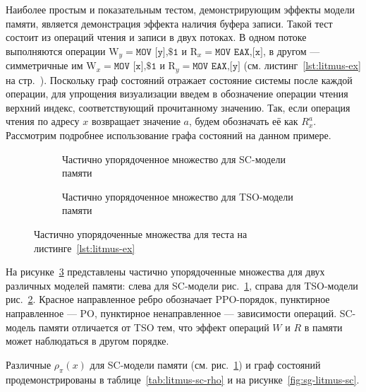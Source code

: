 Наиболее простым и показательным тестом, демонстрирующим эффекты
модели памяти, является демонстрация эффекта наличия буфера записи.
Такой тест состоит из операций чтения и записи в двух потоках. В
одном потоке выполняются операции $\text{W}_y = \texttt{MOV [y],\$1}$
и $\text{R}_x = \texttt{MOV EAX,[x]}$, в другом — симметричные им
$\text{W}_x = \texttt{MOV [x],\$1}$ и $\text{R}_y = \texttt{MOV
EAX,[y]}$ (см. листинг~\ref{lst:litmus-ex} на
стр.~\pageref{lst:litmus-ex}).
Поскольку граф состояний отражает состояние системы после каждой
операции, для упрощения визуализации введем в обозначение операции
чтения верхний индекс, соответствующий прочитанному значению. Так,
если операция чтения по адресу $x$ возвращает значение $a$, будем
обозначать её как $R_x^a$​.
Рассмотрим подробнее использование
графа состояний на данном примере.

\begin{figure}[ht]
  \begin{subfigure}[b]{0.5\textwidth}
    \centering
    
    \caption{Частично упорядоченное множество для SC-модели памяти}
    \label{fig:litmus-sc-program-graph}
  \end{subfigure}%
  \begin{subfigure}[b]{0.5\textwidth}
    \centering
    
    \caption{Частично упорядоченное множество для TSO-модели памяти}
    \label{fig:litmus-tso-program-graph}
  \end{subfigure}
  \caption{Частично упорядоченные множества для теста на
  листинге~\ref{lst:litmus-ex}}
  \label{fig:litmus-program-graph}
\end{figure}

На рисунке~\ref{fig:litmus-program-graph} представлены частично
упорядоченные множества для двух различных моделей памяти: слева для
SC-модели рис.~\ref{fig:litmus-sc-program-graph}, справа для
TSO-модели рис.~\ref{fig:litmus-tso-program-graph}. Красное направленное
ребро обозначает PPO-порядок, пунктирное направленное — PO,
пунктирное ненаправленное — зависимости операций. SC-модель памяти
отличается от TSO тем, что эффект операций $W$ и $R$ в памяти может
наблюдаться в другом порядке.

Различные $\rho_{\pi}(x)$ для SC-модели
памяти (см. рис.~\ref{fig:litmus-sc-program-graph}) и граф состояний
продемонстрированы в таблице~\ref{tab:litmus-sc-rho} и на
рисунке~\ref{fig:sg-litmus-sc}.

